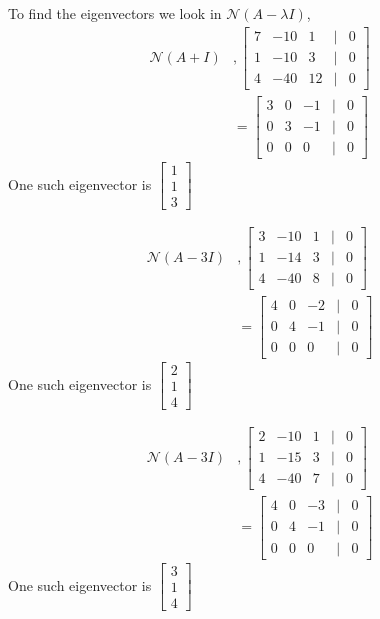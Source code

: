 \documentclass{article}
\begin{document}
To find the eigenvectors we look in \(\mathcal{N}(A-\lambda I)\),
\begin{align*}
    \mathcal{N}(A + I) &, \begin{bmatrix}
        7 & -10 & 1 &| & 0 \\
        1 & -10 & 3 &|& 0 \\
        4 & -40 & 12& |&  0
    \end{bmatrix}
    \\
    &= \begin{bmatrix}
        3 & 0 & -1 &|&0 \\
        0 & 3 & -1 &|&0 \\
        0 & 0 & 0 &|&0
    \end{bmatrix}
\end{align*}
One such eigenvector is \(\begin{bmatrix}
    1 \\ 1 \\ 3
\end{bmatrix}\)

\begin{align*}
    \mathcal{N}(A-3I) &, \begin{bmatrix}
        3 & -10 & 1 &| & 0 \\
        1 & -14 & 3 &|& 0 \\
        4 & -40 & 8& |&  0
    \end{bmatrix}
    \\
    &= \begin{bmatrix}
        4 & 0 & -2 &|&0 \\
        0 & 4 & -1 &|&0 \\
        0 & 0 & 0 &|&0
    \end{bmatrix}
\end{align*}
One such eigenvector is \(\begin{bmatrix}
    2 \\ 1 \\ 4
\end{bmatrix}\)

\begin{align*}
    \mathcal{N}(A-3I) &, \begin{bmatrix}
        2 & -10 & 1 &| & 0 \\
        1 & -15 & 3 &|& 0 \\
        4 & -40 & 7& |&  0
    \end{bmatrix}
    \\
    &= \begin{bmatrix}
        4 & 0 & -3 &|&0 \\
        0 & 4 & -1 &|&0 \\
        0 & 0 & 0 &|&0
    \end{bmatrix}
\end{align*}
One such eigenvector is \(\begin{bmatrix}
    3 \\ 1 \\ 4
\end{bmatrix}\)
\end{document}
